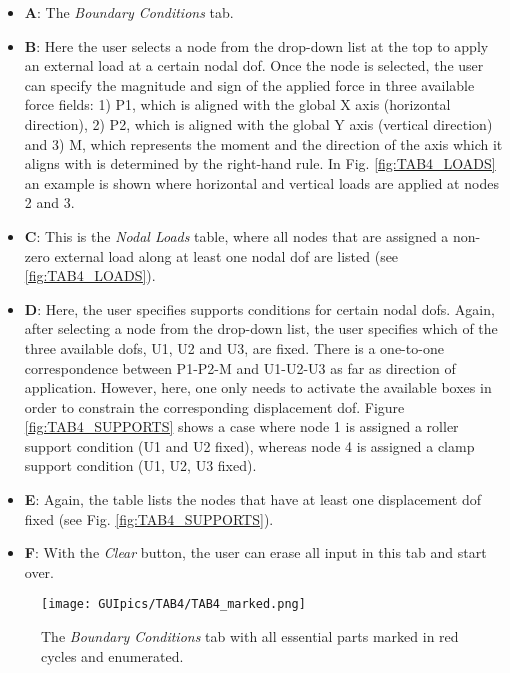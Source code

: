 \begin{appendices}
\begin{itemize}
	\item \textbf{A}: The \textit{Boundary Conditions} tab.
	\item \textbf{B}: Here the user selects a node from the drop-down list at 
	the top to apply an external load at a certain nodal \acrshort{dof}. Once 
	the node is selected, the user can specify the magnitude and sign of the 
	applied force in three available force fields: 1) P1, which is aligned with 
	the global X axis (horizontal direction), 2) P2, which is aligned with the 
	global Y axis (vertical direction) and 3) M, which represents the moment 
	and the direction of the axis which it aligns with is determined by the 
	right-hand rule. In Fig. \ref{fig:TAB4_LOADS} an example is shown where 
	horizontal and vertical loads are applied at nodes 2 and 3.
	\item \textbf{C}: This is the \textit{Nodal Loads} table, where all nodes 
	that are assigned a non-zero external load along at least one nodal 
	\acrshort{dof} are listed (see \ref{fig:TAB4_LOADS}).
	
	\item \textbf{D}: Here, the user specifies supports conditions for certain 
	nodal \acrshort{dof}s. Again, after selecting a node from the drop-down 
	list, the user specifies which of the three available \acrshort{dof}s, U1, 
	U2 and U3, are fixed. There is a one-to-one correspondence between P1-P2-M 
	and U1-U2-U3 as far as direction of application. However, here, one only 
	needs to activate the available boxes in order to constrain the 
	corresponding displacement \acrshort{dof}. Figure \ref{fig:TAB4_SUPPORTS} 
	shows a case where node 1 is assigned a roller support condition (U1 and U2 
	fixed), whereas node 4 is assigned a clamp support condition (U1, U2, U3 
	fixed).
	\item \textbf{E}: Again, the table lists the nodes that have at least one 
	displacement \acrshort{dof} fixed (see Fig. \ref{fig:TAB4_SUPPORTS}).
	
	\item \textbf{F}: With the \textit{Clear} button, the user can erase all 
	input in this tab and start over.
\end{itemize}


\begin{figure}
	\centering
	\texttt{[image: GUIpics/TAB4/TAB4\_marked.png]}
	\caption{The \textit{Boundary Conditions} tab with all essential parts 
		marked in red cycles and enumerated.}
	\label{fig:TAB4_marked}
\end{figure}


\end{appendices}
